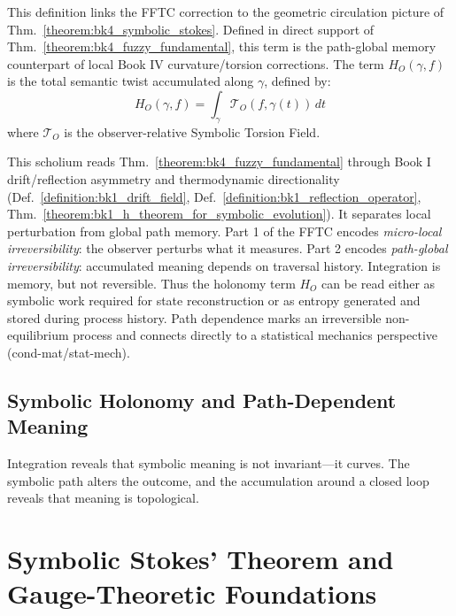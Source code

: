 \begin{definition}
\label{definition:bk4_symbolic_holonomy_term}
This definition links the FFTC correction to the geometric circulation picture of Thm.~\ref{theorem:bk4_symbolic_stokes}.
Defined in direct support of Thm.~\ref{theorem:bk4_fuzzy_fundamental}, this term is the path-global memory counterpart of local Book IV curvature/torsion corrections.
The term $H_O(\gamma, f)$ is the total semantic twist accumulated along $\gamma$, defined by:
\[
H_O(\gamma, f) = \int_\gamma \mathcal{T}_O(f, \gamma(t)) \, dt
\]
where $\mathcal{T}_O$ is the observer-relative Symbolic Torsion Field.
\end{definition}

\begin{scholium}
\label{scholium:bk4_micro_local_vs_path_global_irreversibility}
\leavevmode\newline
This scholium reads Thm.~\ref{theorem:bk4_fuzzy_fundamental} through Book I
drift/reflection asymmetry and thermodynamic directionality
(Def.~\ref{definition:bk1_drift_field},
Def.~\ref{definition:bk1_reflection_operator},
Thm.~\ref{theorem:bk1_h_theorem_for_symbolic_evolution}).
It separates local perturbation from global path memory.
Part 1 of the FFTC encodes \emph{micro-local irreversibility}: the observer
perturbs what it measures. Part 2 encodes \emph{path-global irreversibility}:
accumulated meaning depends on traversal history.
Integration is memory, but not reversible.
Thus the holonomy term $H_O$ can be read either as symbolic work required for
state reconstruction or as entropy generated and stored during process history.
Path dependence marks an irreversible non-equilibrium process and connects
directly to a statistical mechanics perspective (cond-mat/stat-mech).
\end{scholium}

\subsection{Symbolic Holonomy and Path-Dependent Meaning}
\label{subsec:bk4_symbolic_holonomy_theorem}

Integration reveals that symbolic meaning is not invariant---it curves. The symbolic path alters the outcome, and the accumulation around a closed loop reveals that meaning is topological.

\section{Symbolic Stokes' Theorem and Gauge-Theoretic Foundations}
\label{sec:bk4_symbolic_stokes_gauge_theoretic}

